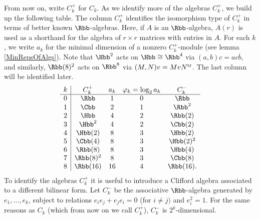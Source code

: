 From now on, write $C^+_k$ for $C_k$. As we identify more of the algebras $C^+_k$, we build up the following table. The column $C^+_k$ identifies the isomorphism type of $C^+_k$ in terms of better known $\Rbb$-algebras. Here, if $A$ is an $\Rbb$-algebra, $A(r)$ is used as a shorthand for the algebra of $r\times r$ matrices with entries in $A$. For each $k$, we write $a_k$ for the minimal dimension of a nonzero $C^+_k$-module (see lemma \ref{MinRepsOfAlgs}). Note that $\Hbb^2$ acts on $\Hbb\cong\Rbb^4$ via $(a,b)c=ac\overline{b}$, and similarly, $\Rbb(8)^2$ acts on $\Rbb^8$ via $(M,N)v=MvN^\textup{tr}$. The last column will be identified later.
\[\begin{array}{c|ccccc} %
k& C^+_k& a_k & \varphi_k = \log_2 a_k &C^-_k \\\hline
0 & \Rbb & 1 & 0 & \Rbb \\
1 & \Cbb & 2 & 1 & \Rbb^2 \\
2 & \Hbb & 4 & 2 & \Rbb(2) \\
3 & \Hbb^2 & 4 & 2 & \Cbb(2) \\
4 & \Hbb(2) & 8 & 3 & \Hbb(2) \\
5 & \Cbb(4) & 8 & 3 & \Hbb(2)^2 \\
6 & \Rbb(8) & 8 & 3 & \Hbb(4) \\
7 & \Rbb(8)^2 & 8 & 3 & \Cbb(8) \\
8 & \Rbb(16) & 16 & 4 & \Rbb(16).
\end{array}\] %
To identify the algebras $C_k^+$ it is useful to introduce a Clifford algebra associated to a different bilinear form. Let $C_k^-$ be the associative $\Rbb$-algebra generated by $e_1, \ldots, e_k$, subject to relations $e_ie_j+e_je_i=0$ (for $i\neq j)$ and $e_i^2=1$. For the same reasons as $C_k$ (which from now on we call $C_k^+$), $C_k^-$ is $2^k$-dimensional.

